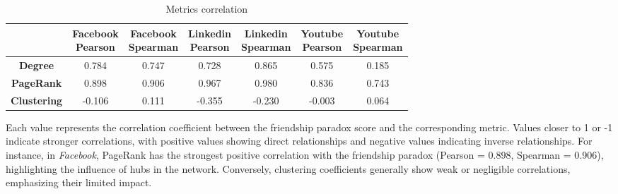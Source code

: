 \documentclass{article}
\begin{document}
\begin{table}[H]
    \centering
    \begin{tabular}{|c|c|c|c|c|c|c|}
        \hline
        & \makecell{Facebook \\ Pearson} & \makecell{Facebook \\ Spearman} & \makecell{Linkedin \\ Pearson}
         & \makecell{Linkedin \\ Spearman} & \makecell{Youtube \\ Pearson} & \makecell{Youtube \\ Spearman} \\ \hline
        \textbf{Degree} & 0.784 & 0.747   & 0.728             & 0.865           & 0.575           & 0.185       \\  \hline

        \textbf{PageRank} & 0.898 & 0.906 & 0.967 & 0.980 & 0.836 & 0.743 \\ \hline

        \textbf{Clustering} &  -0.106 &  0.111 & -0.355 & -0.230 & -0.003 & 0.064\\ \hline
    \end{tabular}
    \caption{Metrics correlation}
\end{table} 

Each value represents the correlation coefficient between the friendship paradox score and the corresponding metric. Values closer to 1 or -1 indicate stronger correlations, with positive values showing direct relationships and negative values indicating inverse relationships.
For instance, in \textit{Facebook}, PageRank has the strongest positive correlation with the friendship paradox (Pearson = 0.898, Spearman = 0.906), highlighting the influence of hubs in the network. Conversely, clustering coefficients generally show weak or negligible correlations, emphasizing their limited impact.
\end{document}
